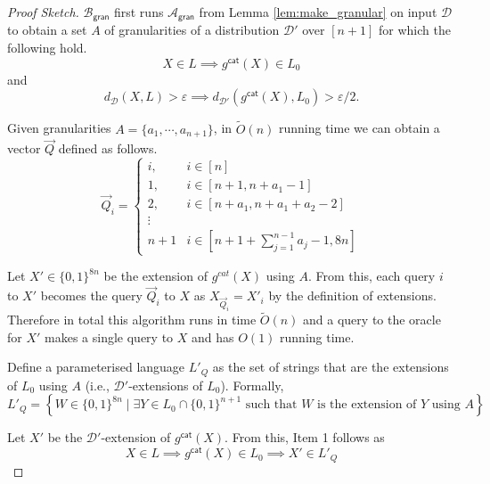 \documentclass[10pt,a4paper]{article}
\newcommand{\gran}{\mathsf{gran}}
\newcommand{\sD}{\mathcal{D}}
\newcommand{\sA}{\mathcal{A}}
\newcommand{\sB}{\mathcal{B}}
\begin{document}
\begin{proof}[Proof Sketch]
$\sB_\gran$ first runs $\sA_\gran$ from Lemma \ref{lem:make_granular} on input $\sD$ to obtain a set $A$ of granularities of a distribution $\sD'$ over $[n+1]$ for which the following hold.
\begin{equation*}
    X\in L\implies g^{\mathsf{cat}}(X)\in L_0
\end{equation*}
and 
\begin{equation*}
    d_{\sD}(X,L)>\varepsilon\implies d_{\sD'}(g^{\mathsf{cat}}(X),L_{0})>\varepsilon/2.
\end{equation*}

Given granularities $A = \{a_{1},\cdots, a_{n+1}\}$, in $\tilde{O}(n)$ running time we can obtain a vector $\vec{Q}$ defined as follows.
\begin{equation*}
    \Vec{Q}_{i}=\begin{cases}
            i, & i\in [n]\\
			1, & i\in[n+1, n+a_{1}-1]\\
            2, & i\in[n+a_{1},n+ a_{1}+a_{2}-2]\\
            \vdots\\
            n+1 & i\in [n+1+\sum_{j=1}^{n-1}a_{j}-1, 8n]
		 \end{cases}
\end{equation*}

Let $X'\in\{0,1\}^{8n}$ be the extension of $g^{cat}(X)$ using $A$. From this, each query $i$ to $X'$ becomes the query $\vec{Q}_{i}$ to $X$ as $X_{\Vec{Q}_{i}}=X'_{i}$ by the definition of extensions. Therefore in total this algorithm runs in time $\tilde{O}(n)$ and a query to the oracle for $X'$ makes a single query to $X$ and has $O(1)$ running time.

Define a parameterised language $L'_Q$ as the set of strings that are the extensions of $L_0$ using $A$ (i.e., $\sD'$-extensions of $L_0$). Formally,
\begin{equation*}
    L'_Q = \left \{W \in \{0,1\}^{8n} \mid \exists Y \in L_0 \cap \{0,1\}^{n+1} \text{ such that } W \text{ is the extension of $Y$ using $A$} \right \}
\end{equation*}



Let $X'$ be the $\sD'$-extension of $g^{\mathsf{cat}}(X)$. From this, Item 1 follows as 
\begin{equation*}
    X\in L\implies g^{\mathsf{cat}}(X)\in L_{0}\implies X'\in L'_Q
\end{equation*}


\end{proof}
\end{document}

